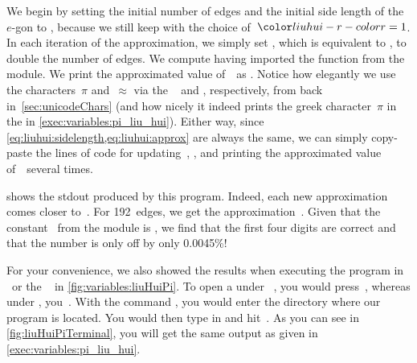 We begin by setting the initial number of edges  and the initial side length of the $e$\nobreakdashes-gon to , because we still keep with the choice of~$\liuhuir=1$.
In each iteration of the approximation, we simply set \pythonIdx{*=}, which is equivalent to , to double the number of edges.
We compute  having imported the  function from the  module.
We print the approximated value of~\numberPi\ as .
Notice how elegantly we use the  characters~$\pi$ and~$\approx$ via the ~ and , respectively, from back in~\cref{sec:unicodeChars} (and how nicely it indeed prints the greek character~$\pi$ in the  in \cref{exec:variables:pi_liu_hui}).
Either way, since \cref{eq:liuhui:sidelength,eq:liuhui:approx} are always the same, we can simply copy-paste the lines of code for updating~, , and printing the approximated value of~\numberPi\ several times.

 shows the \acrfull{stdout} produced by this program.
Indeed, each new approximation comes closer to~\numberPi.
For 192~edges, we get the approximation~.
Given that the constant~ from the  module is , we find that the first four digits are correct and that the number is only off by only 0.0045\%!

For your convenience, we also showed the results when executing the program in \pycharm\ or the \ubuntu\  in \cref{fig:variables:liuHuiPi}.
To open a  under \ubuntu\ \linux, you would press~\ubuntuTerminal, whereas under \microsoftWindows, you~\windowsTerminal.
With the command , you would enter the directory where our program  is located.
You would then type in  and hit~\keys{\enter}.
As you can see in \cref{fig:liuHuiPiTerminal}, you will get the same output as given in \cref{exec:variables:pi_liu_hui}.


